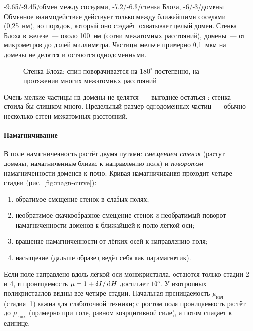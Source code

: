 \begin{masshtab}[ферромагнетизм]{-9.65/-9.45/{обмен между соседями}, -7.2/-6.8/{стенка Блоха}, -6/-3/{домены}}
Обменное взаимодействие действует только между ближайшими соседями
(0,25~нм), но порядок, который оно создаёт, охватывает целый домен.
Стенка Блоха в железе~— около 100~нм (сотни межатомных расстояний),
домены~— от микрометров до долей миллиметра. Частицы мельче примерно
0,1~мкм на домены не делятся и остаются однодоменными.
\end{masshtab}

\begin{figure}[ht]
\centering
{}
\caption{Стенка Блоха: спин поворачивается на $180^\circ$ постепенно, на
протяжении многих межатомных расстояний}
\label{fig:bloch-wall}
\end{figure}

Очень мелкие частицы на домены не делятся~— выгоднее остаться
: стенка стоила бы слишком много. Предельный размер
однодоменных частиц~— обычно несколько сотен межатомных расстояний.

\paragraph{Намагничивание}
В поле намагниченность растёт двумя путями: \emph{смещением стенок}
(растут домены, намагниченные близко к направлению поля) и \emph{поворотом}
намагниченности доменов к полю. Кривая намагничивания проходит четыре
стадии (рис.~\ref{fig:magn-curve}):
\begin{enumerate}
\item обратимое смещение стенок в слабых полях;
\item необратимое скачкообразное смещение стенок и необратимый поворот
намагниченности доменов к ближайшей к полю лёгкой оси;
\item вращение намагниченности от лёгких осей к направлению поля;
\item насыщение (дальше образец ведёт себя как парамагнетик).
\end{enumerate}
Если поле направлено вдоль лёгкой оси монокристалла, остаются только
стадии 2 и 4, и проницаемость $\mu=1+\mathop{}\!\mathrm{d} I/\mathop{}\!\mathrm{d} H$ достигает $10^5$. У
изотропных поликристаллов видны все четыре стадии. Начальная
проницаемость $\mu_\text{нач}$ (стадия~1) важна для слаботочной техники;
с ростом поля проницаемость растёт до $\mu_\text{max}$ (примерно при поле,
равном коэрцитивной силе), а потом спадает к единице.

